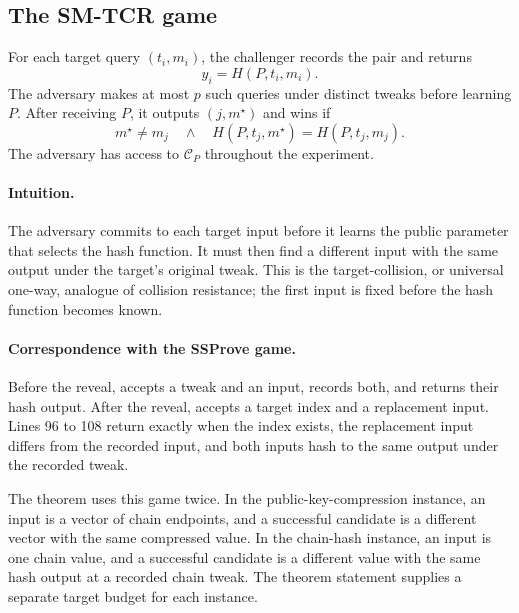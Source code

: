 \documentclass[11pt,a4paper]{article}
\theoremstyle{plain}
\theoremstyle{definition}
\DeclareRobustCommand{\coq}[1]{\texttt{\detokenize{#1}}}
\newcommand{\SSProve}{\textsf{SSProve}\xspace}
\begin{document}
\subsection{The SM-TCR game}

For each target query \((t_i,m_i)\), the challenger records the pair and returns
\[
  y_i=H(P,t_i,m_i).
\]
The adversary makes at most \(p\) such queries under distinct tweaks before learning \(P\).
After receiving \(P\), it outputs \((j,m^\star)\) and wins if
\begin{equation}
\label{eq:smtcr-definition}
  m^\star\ne m_j
  \quad\land\quad
  H(P,t_j,m^\star)=H(P,t_j,m_j).
\end{equation}
The adversary has access to \(\mathcal C_P\) throughout the experiment.

\paragraph{Intuition.}
The adversary commits to each target input before it learns the public parameter that selects the hash function.
It must then find a different input with the same output under the target's original tweak.
This is the target-collision, or universal one-way, analogue of collision resistance; the first input is fixed before the hash function becomes known.



\paragraph{Correspondence with the \SSProve game.}
Before the reveal, \coq{TQUERY} accepts a tweak and an input, records both, and returns their hash output.
After the reveal, \coq{CHECK} accepts a target index and a replacement input.
Lines 96 to 108 return \coq{true} exactly when the index exists, the replacement input differs from the recorded input, and both inputs hash to the same output under the recorded tweak.

The theorem uses this game twice.
In the public-key-compression instance, an input is a vector of chain endpoints, and a successful candidate is a different vector with the same compressed value.
In the chain-hash instance, an input is one chain value, and a successful candidate is a different value with the same hash output at a recorded chain tweak.
The theorem statement supplies a separate target budget for each instance.
\end{document}
